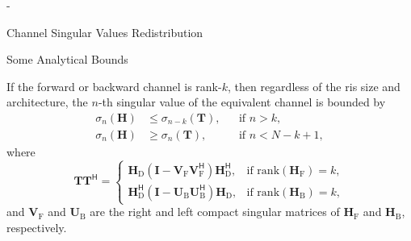 \begin{section}{-}
\begin{subsection}{Channel Singular Values Redistribution}
\begin{subsubsection}{Some Analytical Bounds}
			\begin{proposition}\label{pp:rank_deficient}
				If the forward or backward channel is rank-$k$, then regardless of the \gls{ris} size and architecture, the $n$-th singular value of the equivalent channel is bounded by
				\begin{align}
					\sigma_n(\mathbf{H}) & \le \sigma_{n-k}(\mathbf{T}), &  & \text{if } n > k, \label{iq:sv_bound_enlarge}          \\
					\sigma_n(\mathbf{H}) & \ge \sigma_n(\mathbf{T}),     &  & \text{if } n < N - k + 1, \label{iq:sv_bound_suppress}
				\end{align}
				where
				\begin{equation}
					\mathbf{T} \mathbf{T}^\mathsf{H} =
					\begin{cases}
						\mathbf{H}_\mathrm{D} (\mathbf{I} - \mathbf{V}_\mathrm{F} \mathbf{V}_\mathrm{F}^\mathsf{H}) \mathbf{H}_\mathrm{D}^\mathsf{H}, & \text{if } \mathrm{rank}(\mathbf{H}_\mathrm{F}) = k, \\
						\mathbf{H}_\mathrm{D}^\mathsf{H} (\mathbf{I} - \mathbf{U}_\mathrm{B} \mathbf{U}_\mathrm{B}^\mathsf{H}) \mathbf{H}_\mathrm{D}, & \text{if } \mathrm{rank}(\mathbf{H}_\mathrm{B}) = k,
					\end{cases}
					\label{eq:auxiliary_matrix}
				\end{equation}
				and $\mathbf{V}_\mathrm{F}$ and $\mathbf{U}_\mathrm{B}$ are the right and left compact singular matrices of $\mathbf{H}_\mathrm{F}$ and $\mathbf{H}_\mathrm{B}$, respectively.

\end{proposition}
\end{subsubsection}
\end{subsection}
\end{section}
